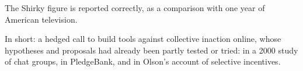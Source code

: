 \begin{afterword}
The Shirky figure is reported correctly, as a comparison with one year of American television.

In short: a hedged call to build tools against collective inaction online, whose hypotheses and proposals had already been partly tested or tried: in a 2000 study of chat groups, in PledgeBank, and in Olson's account of selective incentives.
\end{afterword}
